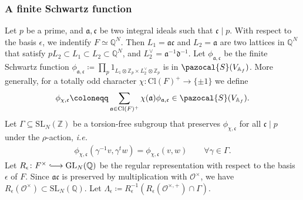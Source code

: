 \documentclass[twoside,a4paper,10pt]{article} %
\newcommand{\8}{\infty}
\newcommand{\Z}{\mathbb{Z}}
\newcommand{\SL}{\mathrm{SL}}
\newcommand{\GL}{\mathrm{GL}}
\newcommand{\A}{\mathbb{A}}
\newcommand{\Q}{\mathbb{Q}}
\newcommand{\afrak}{\mathfrak{a}}
\newcommand{\dfrak}{\mathfrak{d}}
\newcommand{\cfrak}{\mathfrak{c}}
\newcommand{\Ocal}{\mathcal{O}}
\newcommand{\Scal}{\pazocal{S}}
\newcommand{\Cl}{\textrm{Cl}}
\newcommand{\hooklongrightarrow}{\lhook\joinrel\longrightarrow}
\theoremstyle{mytheoremstyle}
\theoremstyle{remark}
\numberwithin{equation}{section}
\begin{document}
 \subsubsection{ A finite Schwartz function} Let $p$ be a prime, and $\afrak,\cfrak$ be two integral ideals such that $\cfrak \mid p$. With respect to the basis $\epsilon$, we indentify $F \simeq \Q^N$. Then $L_1=\afrak \cfrak$ and $L_2=\afrak$ are two lattices in $\Q^N$ that satisfy $pL_2 \subset L_1 \subset L_2 \subset \Q^N$, and $L_2^\vee=\afrak^{-1}\dfrak^{-1}$. Let $\phi_{\afrak,\cfrak}$ be the finite Schwartz function $\phi_{\afrak,\cfrak} \coloneqq \prod_p 1_{L_1 \otimes \Z_p \times L_2^\vee\otimes \Z_p }$ is in $\Scal(V_{\A_f})$. More generally, for a totally odd character $\chi \colon \Cl(F)^+ \longrightarrow \{ \pm 1\}$ we define
\begin{align}
\phi_{\chi,\cfrak} \coloneqq \sum_{\afrak \in \Cl(F)^+} \chi(\afrak)\phi_{\afrak,\cfrak} \in \Scal(V_{\A_f}).
\end{align}
Let $\Gamma \subseteq \SL_N(\Z)$ be a torsion-free subgroup that preserves $\phi_{\chi,\cfrak}$ for all $\cfrak \mid p$ under the $\rho$-action, {\em i.e.}
\begin{align}
\phi_{\chi,\cfrak}(\gamma^{-1}v,\gamma^tw)=\phi_{\chi,\cfrak}(v,w) \qquad \forall \gamma \in \Gamma.
\end{align}
 Let $R_\epsilon \colon F^\times \hooklongrightarrow \GL_N(\Q)$ be the regular representation with respect to the basis $\epsilon$ of $F$. Since $\afrak \cfrak$ is preserved by multiplication with $\Ocal^\times$, we have $R_\epsilon(\Ocal^\times) \subset \SL_N(\Q)$. Let $\Lambda_\epsilon\coloneqq R_\epsilon^{-1}(R_\epsilon(\Ocal^{\times,+}) \cap \Gamma)$. 
 
\end{document}
